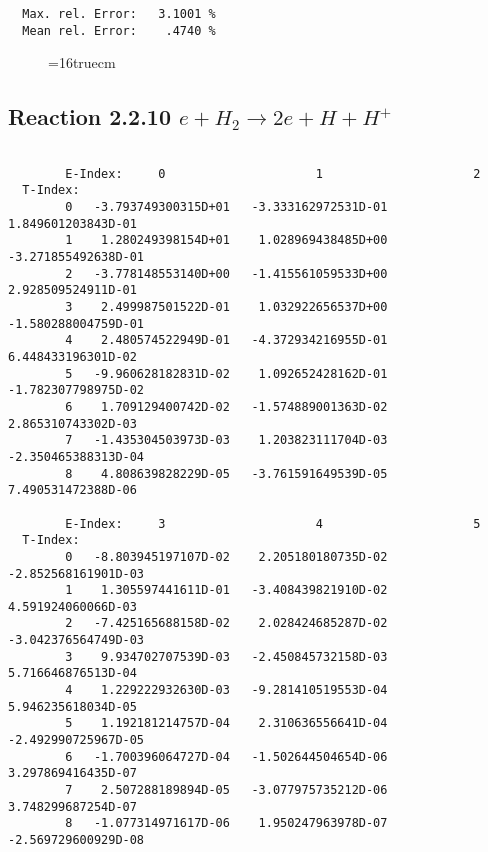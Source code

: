 \documentclass[12pt,dvipdfmx]{article}
\begin{document}
\begin{small}
\begin{verbatim}
  Max. rel. Error:   3.1001 %
  Mean rel. Error:    .4740 %

\end{verbatim}\end{small}
\begin{figure} \label{2.2.9}
\epsfxsize=16truecm
\end{figure}
\newpage

\subsection{
Reaction 2.2.10  $ e + H_2  \rightarrow 2e + H + H^+  $ }

\begin{small}\begin{verbatim}

        E-Index:     0                     1                     2
  T-Index:
        0   -3.793749300315D+01   -3.333162972531D-01    1.849601203843D-01
        1    1.280249398154D+01    1.028969438485D+00   -3.271855492638D-01
        2   -3.778148553140D+00   -1.415561059533D+00    2.928509524911D-01
        3    2.499987501522D-01    1.032922656537D+00   -1.580288004759D-01
        4    2.480574522949D-01   -4.372934216955D-01    6.448433196301D-02
        5   -9.960628182831D-02    1.092652428162D-01   -1.782307798975D-02
        6    1.709129400742D-02   -1.574889001363D-02    2.865310743302D-03
        7   -1.435304503973D-03    1.203823111704D-03   -2.350465388313D-04
        8    4.808639828229D-05   -3.761591649539D-05    7.490531472388D-06

        E-Index:     3                     4                     5
  T-Index:
        0   -8.803945197107D-02    2.205180180735D-02   -2.852568161901D-03
        1    1.305597441611D-01   -3.408439821910D-02    4.591924060066D-03
        2   -7.425165688158D-02    2.028424685287D-02   -3.042376564749D-03
        3    9.934702707539D-03   -2.450845732158D-03    5.716646876513D-04
        4    1.229222932630D-03   -9.281410519553D-04    5.946235618034D-05
        5    1.192181214757D-04    2.310636556641D-04   -2.492990725967D-05
        6   -1.700396064727D-04   -1.502644504654D-06    3.297869416435D-07
        7    2.507288189894D-05   -3.077975735212D-06    3.748299687254D-07
        8   -1.077314971617D-06    1.950247963978D-07   -2.569729600929D-08


\end{verbatim}
\end{small}
\end{document}
